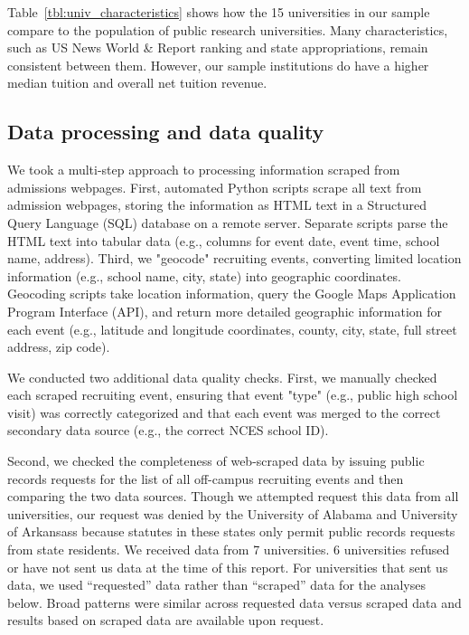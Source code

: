 \documentclass[twoside]{article}
\begin{document}
Table~\ref{tbl:univ_characteristics} shows how the 15 universities in our sample compare to the population of public research universities. Many characteristics, such as US News World \& Report ranking and state appropriations, remain consistent between them. However, our sample institutions do have a higher median tuition and overall net tuition revenue. 


\subsection*{Data processing and data quality}

We took a multi-step approach to processing information scraped from admissions webpages. First, automated Python scripts scrape all text from admission webpages, storing the information as HTML text in a Structured Query Language (SQL) database on a remote server. Separate scripts parse the HTML text into tabular data (e.g., columns for event date, event time, school name, address). Third, we "geocode" recruiting events, converting limited location information (e.g., school name, city, state) into geographic coordinates. Geocoding scripts take location information, query the Google Maps Application Program Interface (API), and return more detailed geographic information for each event (e.g., latitude and longitude coordinates, county, city, state, full street address, zip code).

We conducted two additional data quality checks. First, we manually checked each scraped recruiting event, ensuring that event "type" (e.g., public high school visit) was correctly categorized and that each event was merged to the correct secondary data source (e.g., the correct NCES school ID). 

Second, we checked the completeness of web-scraped data by issuing public records requests for the list of all off-campus recruiting events and then comparing the two data sources. Though we attempted request this data from all universities, our request was denied by the University of Alabama and University of Arkansass because statutes in these states only permit public records requests from state residents. We received data from 7 universities. 6 universities refused or have not sent us data at the time of this report. For universities that sent us data, we used ``requested'' data rather than ``scraped'' data for the analyses below. Broad patterns were similar across requested data versus scraped data and results based on scraped data are available upon request. %
\end{document}
